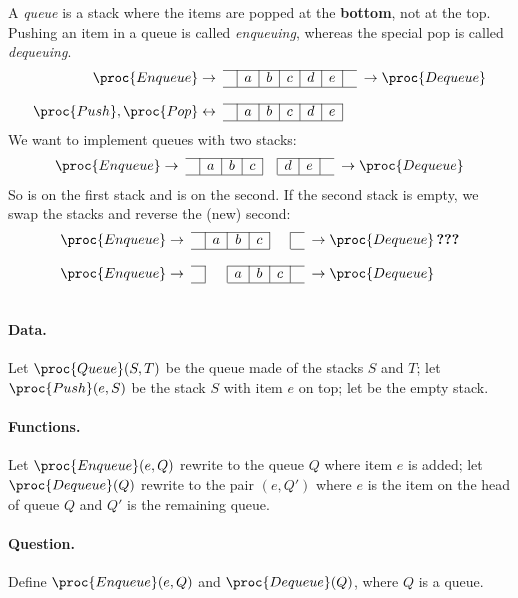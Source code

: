A \emph{queue} is a stack where the items are popped at the
\textbf{bottom}, not at the top. Pushing an item in a queue is called
\emph{enqueuing}, whereas the special pop is called \emph{dequeuing}.
\[
\begin{array}{r@{\;}cc|c|c|c|c|c|cc@{\;}l}
\cline{3-9}
\proc{Enqueue} & \rightarrow & & a & b & c & d & e & & \rightarrow &
\proc{Dequeue}\\
\cline{3-9}\\
\cline{3-8}
\proc{Push}, \proc{Pop} & \leftrightarrow & & a & b & c & d & e &&&\\
\cline{3-8}
\end{array}
\]
\noindent We want to implement queues with two stacks:
\[
\begin{array}{r@{\;}cc|c|c|c|c|c|c|cc@{\;}l}
\cline{3-6}\cline{8-10}
\proc{Enqueue} & \rightarrow & & a & b & c & & d & e & & \rightarrow &
\proc{Dequeue}\\
\cline{3-6}\cline{8-10}
\end{array}
\]
\noindent So  is  on the first stack and
 is  on the second. If the second stack is
empty, we swap the stacks and reverse the (new) second:
\[
\begin{array}{r@{\;}cc|c|c|c|c|cc@{\;}l}
\cline{3-6}\cline{8-8}
\proc{Enqueue} & \rightarrow & & a & b & c & & & \rightarrow &
\proc{Dequeue} \, \textbf{???}\\
\cline{3-6}\cline{8-8}\\
\cline{3-3}\cline{5-8}
\proc{Enqueue} & \rightarrow & & & a & b & c & & \rightarrow &
\proc{Dequeue}\\
\cline{3-3}\cline{5-8}\\
\end{array}
\]
\paragraph{Data.} \noindent Let \(\proc{Queue}(S,T)\) be the
queue made of the stacks \(S\) and \(T\); let \(\proc{Push}(e,S)\) be
the stack \(S\) with item \(e\) on top; let  be the empty
stack.

\paragraph{Functions.} Let \(\proc{Enqueue}(e,Q)\) rewrite to
the queue \(Q\) where item \(e\) is added; let \(\proc{Dequeue}(Q)\)
rewrite to the pair \((e, Q')\) where \(e\) is the item on the head of
queue \(Q\) and \(Q'\) is the remaining queue.

\paragraph{Question.} Define \(\proc{Enqueue}(e,Q)\) and
\(\proc{Dequeue}(Q)\), where \(Q\) is a queue.
